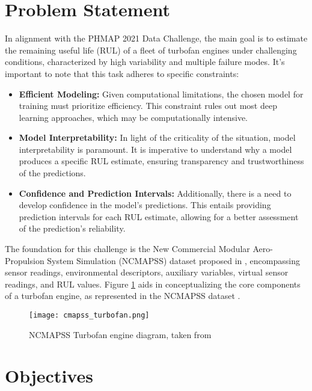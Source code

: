 \documentclass{IEEEtran}
\begin{document}
    \section{Problem Statement} \label{sec:problem_statement}

        In alignment with the PHMAP 2021 Data Challenge, the main goal is to estimate the remaining useful life (RUL) of a fleet of turbofan engines under challenging conditions, characterized by high variability and multiple failure modes. It's important to note that this task adheres to specific constraints:
        \begin{itemize}
            \item \textbf{Efficient Modeling:} Given computational limitations, the chosen model for training must prioritize efficiency. This constraint rules out most deep learning approaches, which may be computationally intensive.
            \item \textbf{Model Interpretability:} In light of the criticality of the situation, model interpretability is paramount. It is imperative to understand why a model produces a specific RUL estimate, ensuring transparency and trustworthiness of the predictions.
            \item \textbf{Confidence and Prediction Intervals:} Additionally, there is a need to develop confidence in the model's predictions. This entails providing prediction intervals for each RUL estimate, allowing for a better assessment of the prediction's reliability.
        \end{itemize}

        The foundation for this challenge is the New Commercial Modular Aero-Propulsion System Simulation (NCMAPSS) dataset proposed in \cite{ncmapss-dataset}, encompassing sensor readings, environmental descriptors, auxiliary variables, virtual sensor readings, and RUL values. Figure \ref{fig:turbofan_diagram} aids in conceptualizing the core components of a turbofan engine, as represented in the NCMAPSS dataset \cite{ncmapss-dataset}.
        \begin{figure}[!htbp]
            \centering
            \texttt{[image: cmapss\_turbofan.png]}
            \caption{NCMAPSS Turbofan engine diagram, taken from \cite{ncmapss-dataset}}
            \label{fig:turbofan_diagram}
        \end{figure}

    \section{Objectives} \label{sec:objectives}
\end{document}
